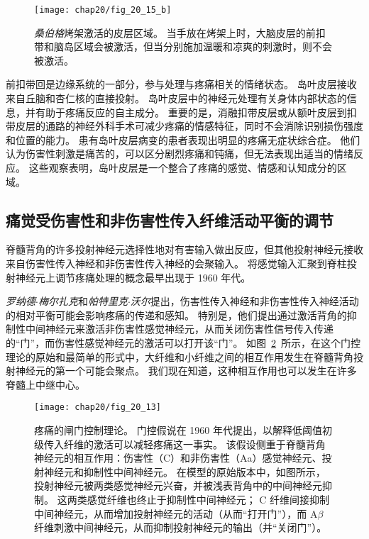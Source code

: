 \begin{figure}[htbp]
	\centering
	\texttt{[image: chap20/fig\_20\_15\_b]}
	\caption{\textit{桑伯格}烤架激活的皮层区域。
		当手放在烤架上时，大脑皮层的前扣带和脑岛区域会被激活，但当分别施加温暖和凉爽的刺激时，则不会被激活。}
	\label{fig:20_15_b}
\end{figure}


前扣带回是边缘系统的一部分，参与处理与疼痛相关的情绪状态。
岛叶皮层接收来自丘脑和杏仁核的直接投射。
岛叶皮层中的神经元处理有关身体内部状态的信息，并有助于疼痛反应的自主成分。
重要的是，消融扣带皮层或从额叶皮层到扣带皮层的通路的神经外科手术可减少疼痛的情感特征，同时不会消除识别损伤强度和位置的能力。
患有岛叶皮层病变的患者表现出明显的疼痛无症状综合症。
他们认为伤害性刺激是痛苦的，可以区分剧烈疼痛和钝痛，但无法表现出适当的情绪反应。
这些观察表明，岛叶皮层是一个整合了疼痛的感觉、情感和认知成分的区域。



\subsection{痛觉受伤害性和非伤害性传入纤维活动平衡的调节}

脊髓背角的许多投射神经元选择性地对有害输入做出反应，但其他投射神经元接收来自伤害性传入神经和非伤害性传入神经的会聚输入。
将感觉输入汇聚到脊柱投射神经元上调节疼痛处理的概念最早出现于 1960 年代。


\textit{罗纳德$\cdot$梅尔扎克}和\textit{帕特里克$\cdot$沃尔}提出，伤害性传入神经和非伤害性传入神经活动的相对平衡可能会影响疼痛的传递和感知。
特别是，他们提出通过激活背角的抑制性中间神经元来激活非伤害性感觉神经元，从而关闭伤害性信号传入传递的“门”，而伤害性感觉神经元的激活可以打开该“门”。 
如图~\ref{fig:20_16}~所示，在这个门控理论的原始和最简单的形式中，大纤维和小纤维之间的相互作用发生在脊髓背角投射神经元的第一个可能会聚点。
我们现在知道，这种相互作用也可以发生在许多脊髓上中继中心。


\begin{figure}[htbp]
	\centering
	\texttt{[image: chap20/fig\_20\_13]}
	\caption{疼痛的闸门控制理论。
		门控假说在 1960 年代提出，以解释低阈值初级传入纤维的激活可以减轻疼痛这一事实。
		该假设侧重于脊髓背角神经元的相互作用：伤害性（C）和非伤害性（Aa）感觉神经元、投射神经元和抑制性中间神经元。
		在模型的原始版本中，如图所示，投射神经元被两类感觉神经元兴奋，并被浅表背角中的中间神经元抑制。 
		这两类感觉纤维也终止于抑制性中间神经元；
		C 纤维间接抑制中间神经元，从而增加投射神经元的活动（从而“打开门”），而 A$ \beta $ 纤维刺激中间神经元，从而抑制投射神经元的输出（并“关闭门”）。}
	\label{fig:20_16}
\end{figure}


